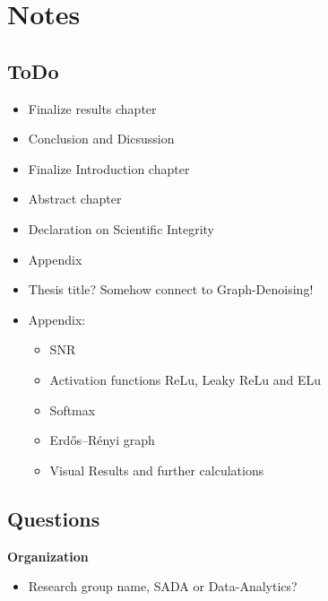 \chapter{Notes}

\section{ToDo}
\begin{itemize}
    \item Finalize results chapter
    \item Conclusion and Dicsussion
    \item Finalize Introduction chapter
    \item Abstract chapter
    \item Declaration on Scientific Integrity
    \item Appendix
    \item Thesis title? Somehow connect to Graph-Denoising!
    \item Appendix:
    \begin{itemize}
        \item SNR
        \item Activation functions ReLu,  Leaky ReLu and ELu
        \item Softmax
        \item Erdős–Rényi graph
        \item Visual Results and further calculations
    \end{itemize}
\end{itemize}

\section{Questions}
\textbf{Organization}
\begin{itemize}
    \item Research group name, SADA or Data-Analytics?
\end{itemize}


